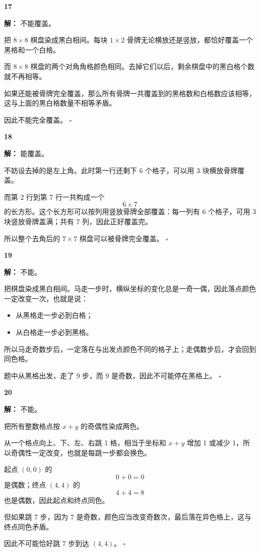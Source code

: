 \documentclass[11pt,a4paper,fontset=fandol]{ctexart}
\theoremstyle{formalexample}
\newenvironment{solution}{\par\noindent\textbf{解：}}{\hfill$\square$\par}
\begin{document}
\textbf{17}\begin{solution}
不能覆盖。

把 $8\times 8$ 棋盘染成黑白相间。每块 $1\times 2$ 骨牌无论横放还是竖放，都恰好覆盖一个黑格和一个白格。

而 $8\times 8$ 棋盘的两个对角角格颜色相同。去掉它们以后，剩余棋盘中的黑白格个数就不再相等。

如果还能被骨牌完全覆盖，那么所有骨牌一共覆盖到的黑格数和白格数应该相等，这与上面的黑白格数量不相等矛盾。

因此不能完全覆盖。
\end{solution}

\textbf{18}\begin{solution}
能覆盖。

不妨设去掉的是左上角。此时第一行还剩下 6 个格子，可以用 3 块横放骨牌覆盖。

而第 2 行到第 7 行一共构成一个
\[
6\times 7
\]
的长方形。这个长方形可以按列用竖放骨牌全部覆盖：每一列有 6 个格子，可用 3 块竖放骨牌盖满；共有 7 列，因此正好覆盖完。

所以整个去角后的 $7\times 7$ 棋盘可以被骨牌完全覆盖。
\end{solution}

\textbf{19}\begin{solution}
不能。

把棋盘染成黑白相间。马走一步时，横纵坐标的变化总是一奇一偶，因此落点颜色一定改变一次，也就是说：
\begin{itemize}
  \item 从黑格走一步必到白格；
  \item 从白格走一步必到黑格。
\end{itemize}

所以马走奇数步后，一定落在与出发点颜色不同的格子上；走偶数步后，才会回到同色格。

题中从黑格出发，走了 9 步，而 9 是奇数，因此不可能停在黑格上。
\end{solution}

\textbf{20}\begin{solution}
不能。

把所有整数格点按 $x+y$ 的奇偶性染成两色。

从一个格点向上、下、左、右跳 1 格，相当于坐标和 $x+y$ 增加 1 或减少 1，所以奇偶性一定改变，也就是每跳一步都会换色。

起点 $(0,0)$ 的
\[
0+0=0
\]
是偶数；终点 $(4,4)$ 的
\[
4+4=8
\]
也是偶数，因此起点和终点同色。

但如果跳 7 步，因为 7 是奇数，颜色应当改变奇数次，最后落在异色格上，这与终点同色矛盾。

因此不可能恰好跳 7 步到达 $(4,4)$。
\end{solution}
\end{document}
